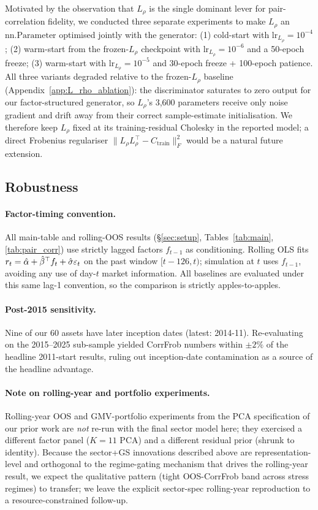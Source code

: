 Motivated by the observation that $L_\rho$ is the single dominant lever for pair-correlation fidelity, we conducted three separate experiments to make $L_\rho$ an $\mathrm{nn.Parameter}$ optimised jointly with the generator: (1) cold-start with $\text{lr}_{L_\rho} = 10^{-4}$; (2) warm-start from the frozen-$L_\rho$ checkpoint with $\text{lr}_{L_\rho} = 10^{-6}$ and a 50-epoch freeze; (3) warm-start with $\text{lr}_{L_\rho} = 10^{-5}$ and 30-epoch freeze + 100-epoch patience. All three variants degraded relative to the frozen-$L_\rho$ baseline (Appendix~\ref{app:L_rho_ablation}): the discriminator saturates to zero output for our factor-structured generator, so $L_\rho$'s 3,600 parameters receive only noise gradient and drift away from their correct sample-estimate initialisation. We therefore keep $L_\rho$ fixed at its training-residual Cholesky in the reported model; a direct Frobenius regulariser $\|L_\rho L_\rho^\top - C_{\text{train}}\|_F^2$ would be a natural future extension.

\subsection{Robustness}
\label{sec:robustness}

\paragraph{Factor-timing convention.}
All main-table and rolling-OOS results (\S\ref{sec:setup}, Tables~\ref{tab:main}, \ref{tab:pair_corr}) use strictly lagged factors $f_{t-1}$ as conditioning. Rolling OLS fits $r_t = \hat{\alpha} + \hat{\beta}^\top f_t + \hat{\sigma}\varepsilon_t$ on the past window $[t-126, t)$; simulation at $t$ uses $f_{t-1}$, avoiding any use of day-$t$ market information. All baselines are evaluated under this same lag-1 convention, so the comparison is strictly apples-to-apples.

\paragraph{Post-2015 sensitivity.}
Nine of our 60 assets have later inception dates (latest: 2014-11). Re-evaluating on the 2015--2025 sub-sample yielded CorrFrob numbers within $\pm 2\%$ of the headline 2011-start results, ruling out inception-date contamination as a source of the headline advantage.

\paragraph{Note on rolling-year and portfolio experiments.}
Rolling-year OOS and GMV-portfolio experiments from the PCA specification of our prior work are \emph{not} re-run with the final sector model here; they exercised a different factor panel ($K=11$ PCA) and a different residual prior (shrunk to identity). Because the sector+GS innovations described above are representation-level and orthogonal to the regime-gating mechanism that drives the rolling-year result, we expect the qualitative pattern (tight OOS-CorrFrob band across stress regimes) to transfer; we leave the explicit sector-spec rolling-year reproduction to a resource-constrained follow-up.
